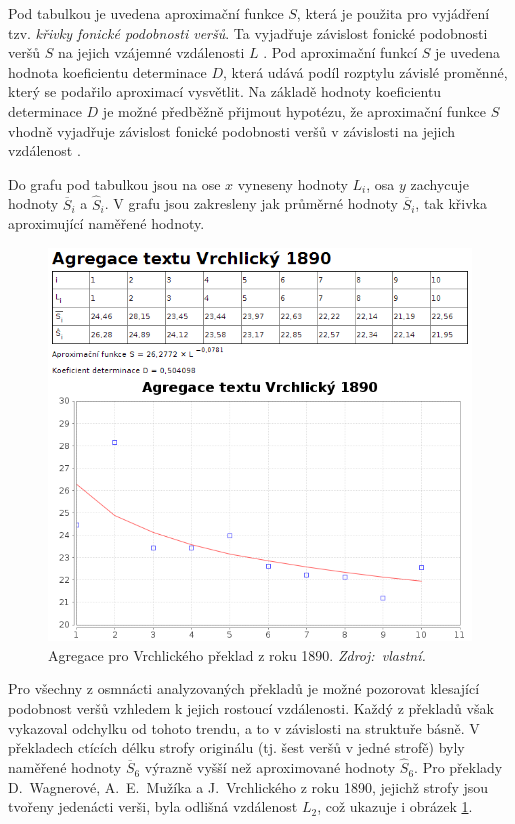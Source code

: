 \documentclass[dp.tex]{subfiles}
\begin{document}
Pod tabulkou je uvedena aproximační funkce $S$, která je použita pro vyjádření tzv. \textit{křivky fonické podobnosti veršů}. Ta vyjadřuje závislost fonické podobnosti veršů $S$ na jejich vzájemné vzdálenosti $L$ \cite[str.~78]{Wimmer2003}. Pod aproximační funkcí $S$ je uvedena hodnota koeficientu determinace $D$, která udává podíl rozptylu závislé proměnné, který se podařilo aproximací vysvětlit. Na základě hodnoty koeficientu determinace $D$ je možné předběžně přijmout hypotézu, že aproximační funkce $S$ vhodně vyjadřuje závislost fonické podobnosti veršů v závislosti na jejich vzdálenost \cite[str.~79]{Wimmer2003}. 

Do grafu pod tabulkou jsou na ose $x$ vyneseny hodnoty $L_i$, osa $y$ zachycuje hodnoty  $\overline{S}_i$ a $\hat{S}_i$. V grafu jsou zakresleny jak průměrné hodnoty $\overline{S}_i$, tak křivka aproximující naměřené hodnoty. 

\begin{figure}[H]
	\centering
	\includegraphics[max width=\textwidth,keepaspectratio=true]{imgs-70-prakticka/aggregation_vrchlicky_1890}
	\caption[Agregace pro Vrchlického překlad z roku 1890]{Agregace pro Vrchlického překlad z roku 1890. \textit{Zdroj:~vlastní.}}
	\label{fig:agregace-vrchlicky-1890}
\end{figure}

Pro všechny z osmnácti analyzovaných překladů je možné pozorovat klesající podobnost veršů vzhledem k jejich rostoucí vzdálenosti. Každý z překladů však vykazoval odchylku od tohoto trendu, a to v závislosti na struktuře básně. V překladech ctících délku strofy originálu (tj. šest veršů v jedné strofě) byly naměřené hodnoty $\overline{S}_6$ výrazně vyšší než aproximované hodnoty $\hat{S}_6$. Pro překlady D.~Wagnerové, A.~E.~Mužíka a J.~Vrchlického z roku 1890, jejichž strofy jsou tvořeny jedenácti verši, byla odlišná vzdálenost $L_2$, což ukazuje i obrázek \ref{fig:agregace-vrchlicky-1890}.
\end{document}
